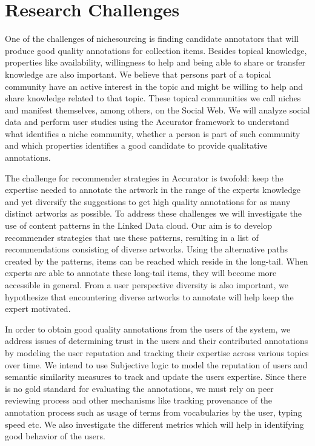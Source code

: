 \section{Research Challenges}\label{use_case}

One of the challenges of nichesourcing is finding candidate annotators that will produce good quality annotations for collection items. Besides topical knowledge, properties like availability, willingness to help and being able to share or transfer knowledge are also important. We believe that persons part of a topical community have an active interest in the topic and might be willing to help and share knowledge related to that topic. These topical communities we call niches and manifest themselves, among others, on the Social Web. We will analyze social data and perform user studies using the Accurator framework to understand what identifies a niche community, whether a person is part of such community and which properties identifies a good candidate to provide qualitative annotations. 

The challenge for recommender strategies in Accurator is twofold: keep the expertise needed to annotate the artwork in the range of the experts knowledge and yet diversify the suggestions to get high quality annotations for as many distinct artworks as possible. To address these challenges we will investigate the use of content patterns in the Linked Data cloud. Our aim is to develop recommender strategies that use these patterns, resulting in a list of recommendations consisting of diverse artworks. Using the alternative paths created by the patterns, items can be reached which reside in the long-tail. When experts are able to annotate these long-tail items, they will become more accessible in general. From a user perspective diversity is also important, we hypothesize that encountering diverse artworks to annotate will help keep the expert motivated.

In order to obtain good quality annotations from the users of the system, we address issues of determining trust in the users and their contributed annotations by modeling the user reputation and tracking their expertise across various topics over time. We intend to use Subjective logic to model the reputation of users and semantic similarity measures to track and update the users expertise. Since there is no gold standard for evaluating the annotations, we must rely on peer reviewing process and other mechanisms like tracking provenance of the annotation process such as usage of terms from vocabularies by the user, typing speed etc. We also investigate the different metrics which will help in identifying good behavior of the users. 

